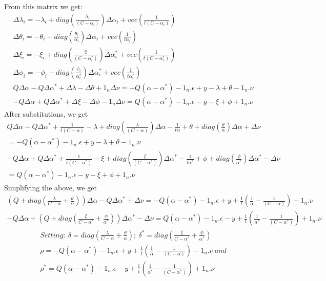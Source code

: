 \documentclass[12pt]{article}
\begin{document}
\newline
 From this matrix we get:
 \begin{gather*} 
 \Delta\lambda_{i} = -\lambda_{i} +diag(\frac{\lambda_{i}}{(C-\alpha_{i})})\Delta \alpha_{i} +vec(\frac{1}{t(C-\alpha_{i})})\\
 \Delta\theta_{i} = -\theta_{i} -diag(\frac{\theta_{i}}{\alpha_{i}})\Delta \alpha_{i} +vec(\frac{1}{t\alpha_{i}})\\
 \Delta\xi_{i} = -\xi_{i} +diag(\frac{\xi}{(C-\alpha^*_{i})})\Delta \alpha^*_{i} +vec(\frac{1}{t(C-\alpha^*_{i})})\\
 \Delta\phi_{i} = -\phi_{i} -diag(\frac{\phi_{i}}{\alpha^*_{i}})\Delta \alpha^*_{i} +vec(\frac{1}{t\alpha^*_{i}})\\
 Q\Delta\alpha - Q\Delta\alpha^*+ \Delta\lambda - \Delta\theta + 1_{n}\Delta\nu
 =-Q(\alpha - \alpha^*) - 1_{n}.\epsilon + y - \lambda + \theta - 1_{n}.\nu\\
 -Q\Delta\alpha + Q\Delta\alpha^*+ \Delta\xi - \Delta\phi - 1_{n}\Delta\nu
 =Q(\alpha - \alpha^*) - 1_{n}.\epsilon - y - \xi + \phi + 1_{n}.\nu
 \end{gather*}
 After substitutions, we get
 \begin{gather*} 
 Q\Delta\alpha - Q\Delta\alpha^*+ \frac{1}{t(C-\alpha)}-\lambda+diag(\frac{\lambda}{(C-\alpha)})\Delta\alpha-\frac{1}{t\alpha}+\theta+diag(\frac{\theta}{\alpha})\Delta\alpha+\Delta\nu\\
 =-Q(\alpha - \alpha^*) - 1_{n}.\epsilon + y - \lambda + \theta - 1_{n}.\nu\\ 
 -Q\Delta\alpha + Q\Delta\alpha^*+ \frac{1}{t(C-\alpha^*)}-\xi+diag(\frac{\xi}{(C-\alpha^*)})\Delta\alpha^*-\frac{1}{t\alpha^*}+\phi+diag(\frac{\phi}{\alpha^*})\Delta\alpha^*-\Delta\nu\\
 =Q(\alpha - \alpha^*) - 1_{n}.\epsilon - y - \xi + \phi + 1_{n}.\nu
  \end{gather*}
Simplifying the above, we get
 \begin{gather*} 
(Q + diag(\frac{\lambda}{C-\alpha} + \frac{\theta}{\alpha}))\Delta\alpha - Q\Delta\alpha^*+ \Delta\nu
 =-Q(\alpha - \alpha^*) - 1_{n}.\epsilon + y +\frac{1}{t}(\frac{1}{\alpha}-\frac{1}{(C-\alpha)}) - 1_{n}.\nu\\
-Q\Delta\alpha +  (Q + diag(\frac{\xi}{C-\alpha^*} + \frac{\phi}{\alpha^*}))\Delta\alpha^*- \Delta\nu
 =Q(\alpha - \alpha^*) - 1_{n}.\epsilon - y +\frac{1}{t}(\frac{1}{\alpha^*}-\frac{1}{(C-\alpha^*)}) + 1_{n}.\nu
 \end{gather*}
 \begin{gather*}
 Setting:\ \delta=diag(\frac{\lambda}{C-\alpha} + \frac{\theta}{\alpha});\   \delta^*=diag(\frac{\xi}{C-\alpha^*} + \frac{\phi}{\alpha^*})\\
\rho=-Q(\alpha - \alpha^*) - 1_{n}.\epsilon + y +\frac{1}{t}(\frac{1}{\alpha}-\frac{1}{(C-\alpha)}) - 1_{n}.\nu\ and\\
\rho^*=Q(\alpha - \alpha^*) - 1_{n}.\epsilon - y +\frac{1}{t}(\frac{1}{\alpha^*}-\frac{1}{(C-\alpha^*)}) + 1_{n}.\nu
 \end{gather*}
\end{document}
